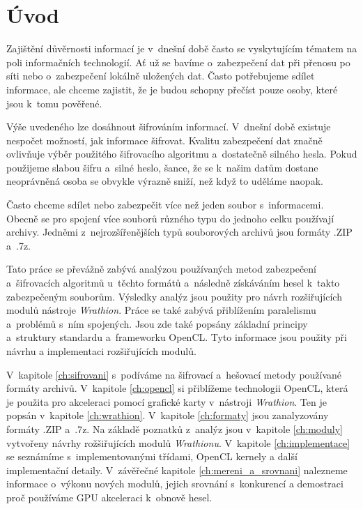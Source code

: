\chapter{Úvod}
Zajištění důvěrnosti informací je v~dnešní době často se vyskytujícím tématem na poli informačních
technologií. Ať už se bavíme o~zabezpečení dat při přenosu po síti nebo o~zabezpečení lokálně
uložených dat. Často potřebujeme sdílet informace, ale chceme zajistit, že je budou schopny přečíst
pouze osoby, které jsou k~tomu pověřené.

 Výše uvedeného lze dosáhnout šifrováním informací. V~dnešní době existuje nespočet možností, jak
informace šifrovat. Kvalitu zabezpečení dat značně ovlivňuje výběr použitého šifrovacího
algoritmu a~dostatečně silného hesla. Pokud použijeme slabou šifru a~silné heslo, šance, že se
k~našim datům dostane neoprávněná osoba se obvykle výrazně sniží, než když to uděláme naopak.

 Často chceme sdílet nebo zabezpečit více než jeden soubor s~informacemi. Obecně se pro
spojení více souborů různého typu do jednoho celku používají archivy. Jedněmi z~nejrozšířenějších
typů souborových archivů jsou formáty .ZIP a~.7z.

 Tato práce se převážně zabývá analýzou používaných metod zabezpečení a~šifrovacích
algoritmů u~těchto formátů a~následně získáváním hesel k~takto zabezpečeným souborům. Výsledky
analýz jsou použity pro návrh rozšiřujících modulů nástroje {\it Wrathion}. Práce se také
zabývá přiblížením paralelismu a~problémů s~ním spojených. Jsou zde také popsány základní
principy a~struktury standardu a~frameworku OpenCL. Tyto informace jsou použity při návrhu a
implementaci rozšiřujících modulů.

 V~kapitole \ref{ch:sifrovani} s~podíváme na šifrovací a~hešovací metody používané formáty
archivů. V~kapitole \ref{ch:opencl} si přiblížeme technologii OpenCL, která je použita pro
akceleraci pomocí grafické karty v~nástroji {\it Wrathion}. Ten je popsán v~kapitole
\ref{ch:wrathion}. V~kapitole \ref{ch:formaty} jsou zanalyzovány formáty .ZIP a~.7z. Na základě
poznatků z~analýz jsou v~kapitole \ref{ch:moduly} vytvořeny návrhy rožšiřujících modulů {\it
Wrathionu}. V~kapitole \ref{ch:implementace} se seznámíme s~implementovanými třídami, OpenCL
kernely a další implementační detaily. V~závěřečné kapitole \ref{ch:mereni_a_srovnani} nalezneme
informace o~výkonu nových modulů, jejich srovnání s~konkurencí a demostraci proč používáme GPU
akceleraci k~obnově hesel.

